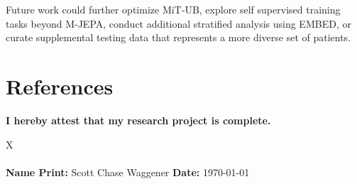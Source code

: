 \documentclass[12pt]{article}
\begin{document}
Future work could further optimize MiT-UB, explore self supervised training tasks beyond M-JEPA, conduct additional stratified analysis using EMBED, or curate supplemental testing data that represents a more diverse set of patients.


\pagebreak
\section{References}
\noindent
\renewcommand{\refname}{}



\vspace{4\baselineskip}
\noindent
\textbf{I hereby attest that my research project is complete.}

\vspace{1cm}
\noindent X \underline{\hspace{10cm}}  \\
\\
\noindent \textbf{Name Print:} Scott Chase Waggener \hfill \textbf{Date:} \today
\end{document}
